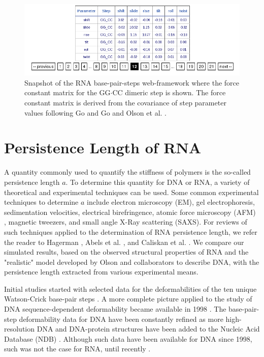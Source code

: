 \begin{figure}[htbp]
\centering
\includegraphics[angle=0, scale=0.58]{Chapter4/forceconst.png}
\caption{Snapshot of  the RNA base-pair-steps  web-framework where the
  force constant matrix for the GG$\cdot$CC dimeric step is shown. The
  force  constant  matrix  is  derived  from the  covariance  of  step
  parameter  values following  Go and  Go \cite{go1976}  and  Olson et
  al. \cite{olson1998}.}
\label{fig:forceconst}
\end{figure}  

\section{Persistence Length of RNA}
A quantity commonly used to  quantify the stiffness of polymers is the
so-called persistence  length $a$. To determine this  quantity for DNA
or RNA,  a variety of  theoretical and experimental techniques  can be
used.  Some  common experimental  techniques to determine  $a$ include
electron   microscopy   (EM),   gel   electrophoresis,   sedimentation
velocities, electrical birefringence,  atomic force microscopy (AFM) ,
magnetic  tweezers,  and small  angle  X-Ray  scattering (SAXS).   For
reviews  of  such  techniques  applied  to the  determination  of  RNA
persistence    length,    we   refer    the    reader   to    Hagerman
\cite{hagerman1997}, Abels  et al.  \cite{abels2005},  and Caliskan et
al.  \cite{caliskan2005}.  We compare  our simulated results, based on
the observed  structural properties of  RNA and the  "realistic" model
developed by Olson and collaborators \cite{marky1994a, maroun1988a} to
describe  DNA,  with the  persistence  length  extracted from  various
experimental means.

Initial studies started with  selected data for the deformabilities of
the ten unique Watson-Crick  base-pair steps \cite{olson1995}.  A more
complete  picture  applied  to  the study  of  DNA  sequence-dependent
deformability   became  available   in  1998   \cite{olson1998}.   The
base-pair-step deformability data for DNA have been constantly refined
as more high-resolution DNA and DNA-protein structures have been added
to  the   Nucleic  Acid  Database   (NDB)  \cite{balasubramanian2009}.
Although such  data have been available  for DNA since  1998, such was
not the case for RNA, until recently \cite{olson2009}.


